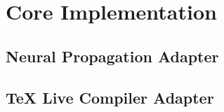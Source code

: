 \chapter{Core Implementation}

\section{Neural Propagation Adapter}

\section{TeX Live Compiler Adapter}

